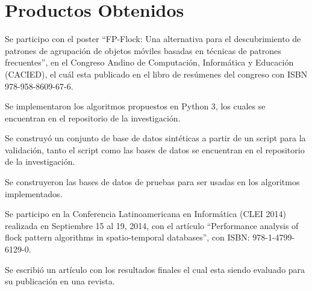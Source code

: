 \chapter{Productos Obtenidos}

Se participo con el poster ``FP-Flock: Una alternativa para el descubrimiento de patrones de 
agrupación de objetos móviles
basadas en técnicas de patrones frecuentes'', en el Congreso Andino de Computación, Informática y 
Educación (CACIED), el cuál esta publicado en el libro de resúmenes del congreso con ISBN 
978-958-8609-67-6.

Se implementaron los algoritmos propuestos en Python 3, los cuales se encuentran en el repositorio de la investigación.

Se construyó un conjunto de base de datos sintéticas a partir de un script para la validación, 
tanto el script como las bases de datos se encuentran en el repositorio de la investigación.

Se construyeron las bases de datos de pruebas para ser usadas en los algoritmos implementados.

Se participo en la Conferencia Latinoamericana en Informática (CLEI 2014) realizada en Septiembre 
15 al 19, 2014, con el artículo ``Performance analysis of 
flock pattern algorithms in spatio-temporal databases'',  con ISBN: 978-1-4799-6129-0.

Se escribió un artículo con los resultados finales el cual esta siendo evaluado para su publicación en una revista.
